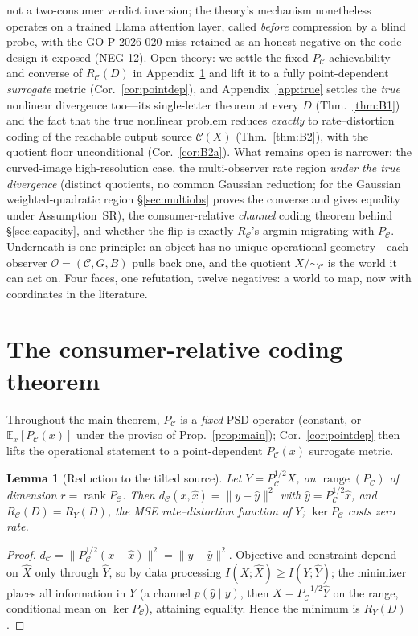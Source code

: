 \documentclass[11pt]{article}
\newtheorem{lemma}{Lemma}
\theoremstyle{definition}
\theoremstyle{remark}
\newcommand{\PC}{P_{\mathcal{C}}}
\newcommand{\E}{\mathbb{E}}
\begin{document}
not a two-consumer verdict inversion; the theory's mechanism nonetheless operates on a
trained Llama attention layer, called \emph{before} compression by a blind probe, with
the GO-P-2026-020 miss retained as an honest negative on the code design it exposed
(NEG-12). Open
theory: we settle the fixed-$\PC$ achievability and converse of $R_{\mathcal{C}}(D)$
in Appendix~\ref{app:coding} and lift it to a fully point-dependent \emph{surrogate}
metric (Cor.~\ref{cor:pointdep}), and Appendix~\ref{app:true} settles the \emph{true}
nonlinear divergence too---its single-letter theorem at every $D$ (Thm.~\ref{thm:B1})
and the fact that the true nonlinear problem reduces \emph{exactly} to rate--distortion
coding of the reachable output source $\mathcal{C}(X)$ (Thm.~\ref{thm:B2}), with the
quotient floor unconditional (Cor.~\ref{cor:B2a}). What
remains open is narrower: the curved-image high-resolution case, the multi-observer
rate region \emph{under the true divergence} (distinct quotients, no common Gaussian
reduction; for the Gaussian weighted-quadratic region \S\ref{sec:multiobs} proves the
converse and gives equality under Assumption~SR), the
consumer-relative
\emph{channel} coding theorem behind \S\ref{sec:capacity}, and whether the flip is
exactly $R_{\mathcal{C}}$'s argmin migrating with $\PC$. Underneath is one
principle: an object has no unique operational geometry---each observer
$\mathcal{O}=(\mathcal{C},G,B)$ pulls back one, and the quotient
$X/\!\sim_{\mathcal{C}}$ is the world it can act on. Four faces, one refutation,
twelve negatives: a world to map, now with coordinates in the literature.

\appendix
\section{The consumer-relative coding theorem}\label{app:coding}

Throughout the main theorem, $\PC$ is a \emph{fixed} PSD operator (constant, or
$\E_x[\PC(x)]$ under the proviso of Prop.~\ref{prop:main}); Cor.~\ref{cor:pointdep}
then lifts the operational statement to a point-dependent $\PC(x)$ surrogate metric.

\begin{lemma}[Reduction to the tilted source]\label{lem:tilt}
Let $Y=\PC^{1/2}X$, on $\operatorname{range}(\PC)$ of dimension $r=\operatorname{rank}\PC$.
Then $d_{\mathcal{C}}(x,\hat x)=\|y-\hat y\|^2$ with $\hat y=\PC^{1/2}\hat x$, and
$R_{\mathcal{C}}(D)=R_Y(D)$, the MSE rate--distortion function of $Y$; $\ker\PC$ costs
zero rate.
\end{lemma}
\begin{proof}
$d_{\mathcal{C}}=\|\PC^{1/2}(x-\hat x)\|^2=\|y-\hat y\|^2$. Objective and constraint
depend on $\hat X$ only through $\hat Y$, so by data processing $I(X;\hat X)\ge
I(Y;\hat Y)$; the minimizer places all information in $Y$ (a channel $p(\hat y\mid y)$,
then $\hat X=\PC^{-1/2}\hat Y$ on the range, conditional mean on $\ker\PC$), attaining
equality. Hence the minimum is $R_Y(D)$.
\end{proof}
\end{document}
